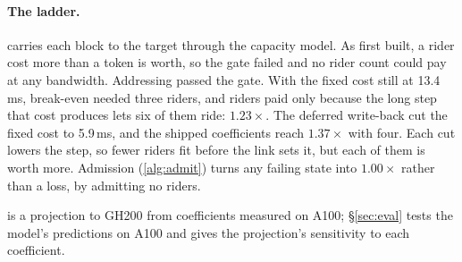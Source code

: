 \paragraph{The ladder.}  carries each block to the target
through the capacity model. As first built, a rider cost more than a token is
worth, so the gate failed and no rider count could pay at any bandwidth.
Addressing passed the gate. With the fixed cost still at 13.4\,ms, break-even
needed three riders, and riders paid only because the long step that cost
produces lets six of them ride: $1.23\times$. The deferred write-back cut the
fixed cost to 5.9\,ms, and the shipped coefficients reach $1.37\times$ with
four. Each cut lowers the step, so fewer riders fit before the link sets it,
but each of them is worth more. Admission (\cref{alg:admit}) turns any failing state into $1.00\times$
rather than a loss, by admitting no riders.

 is a projection to GH200 from coefficients measured on A100;
\S\ref{sec:eval} tests the model's predictions on A100 and gives the
projection's sensitivity to each coefficient.
